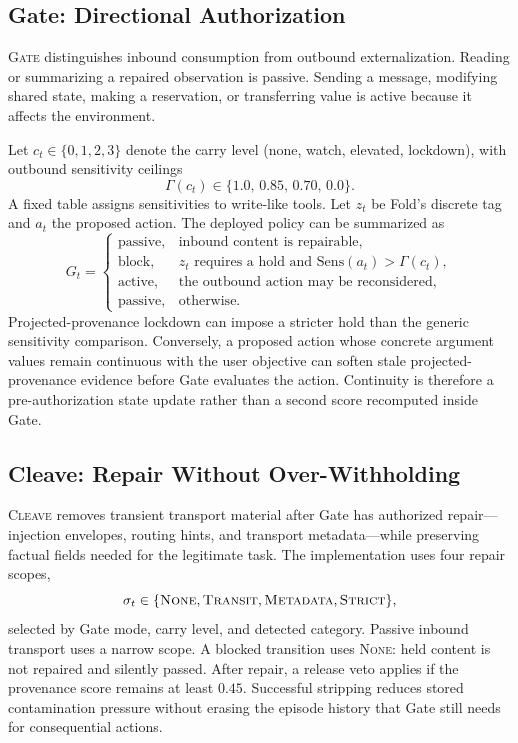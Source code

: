 \subsection{Gate: Directional Authorization}

\textsc{Gate} distinguishes inbound consumption from outbound externalization. Reading or summarizing a repaired observation is passive. Sending a message, modifying shared state, making a reservation, or transferring value is active because it affects the environment.

Let $c_t\in\{0,1,2,3\}$ denote the carry level (none, watch, elevated, lockdown), with outbound sensitivity ceilings
\begin{equation}
    \Gamma(c_t)\in\{1.0,\,0.85,\,0.70,\,0.0\}.
\end{equation}
A fixed table assigns sensitivities to write-like tools. Let $z_t$ be Fold's discrete tag and $a_t$ the proposed action. The deployed policy can be summarized as
\begin{equation}
G_t =
\begin{cases}
\mathrm{passive}, & \text{inbound content is repairable},\\
\mathrm{block}, & z_t \text{ requires a hold and }
                  \mathrm{Sens}(a_t)>\Gamma(c_t),\\
\mathrm{active}, & \text{the outbound action may be reconsidered},\\
\mathrm{passive}, & \text{otherwise}.
\end{cases}
\end{equation}
Projected-provenance lockdown can impose a stricter hold than the generic sensitivity comparison. Conversely, a proposed action whose concrete argument values remain continuous with the user objective can soften stale projected-provenance evidence before Gate evaluates the action. Continuity is therefore a pre-authorization state update rather than a second score recomputed inside Gate.

\subsection{Cleave: Repair Without Over-Withholding}

\textsc{Cleave} removes transient transport material after Gate has authorized repair---injection envelopes, routing hints, and transport metadata---while preserving factual fields needed for the legitimate task. The implementation uses four repair scopes,
\begin{equation}
    \sigma_t\in
    \{\textsc{None},\textsc{Transit},\textsc{Metadata},\textsc{Strict}\},
\end{equation}
selected by Gate mode, carry level, and detected category. Passive inbound transport uses a narrow scope. A blocked transition uses \textsc{None}: held content is not repaired and silently passed. After repair, a release veto applies if the provenance score remains at least $0.45$. Successful stripping reduces stored contamination pressure without erasing the episode history that Gate still needs for consequential actions.

